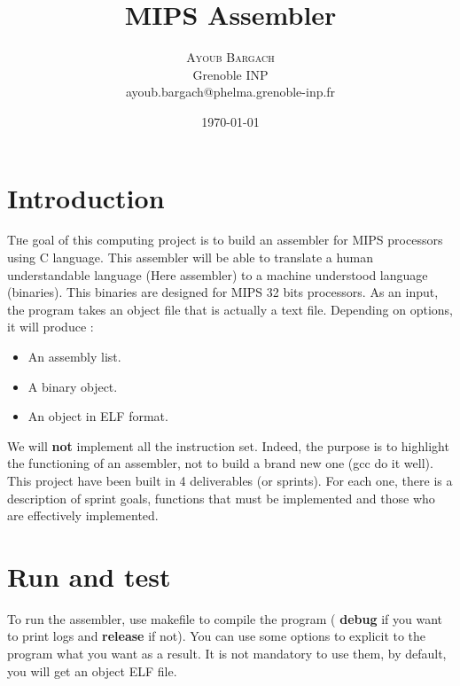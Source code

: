 \documentclass[twoside,twocolumn]{article}
\title{MIPS Assembler} %
\author{%
\textsc{Ayoub Bargach} \\[1ex] %
\normalsize Grenoble INP \\ %
\normalsize ayoub.bargach@phelma.grenoble-inp.fr %
}
\date{\today} %
\begin{document}
\maketitle


\section{Introduction}

\lettrine[nindent=0em,lines=3]{T} he goal of this computing project is to build an assembler for MIPS processors using C language. This assembler will be able to translate a human understandable language (Here assembler) to a machine understood language (binaries). This binaries are designed for MIPS 32 bits processors. As an input, the program takes an object file that is actually a text file. Depending on options, it will produce :

\begin{itemize}

  \item An assembly list.
  \item A binary object.
  \item An object in ELF format.

\end{itemize}

We will \textbf{not} implement all the instruction set. Indeed, the purpose is to highlight the functioning of an assembler, not to build a brand new one (gcc do it well). This project have been built in 4 deliverables (or sprints). For each one, there is a description of sprint goals, functions that must be implemented and those who are effectively implemented.





\section{Run and test}

To run the assembler, use makefile to compile the program (\textbf{ debug } if you want to print logs and \textbf{ release } if not). You can use some options to explicit to the program what you want as a result. It is not mandatory to use them, by default, you will get an object ELF file.
\end{document}
